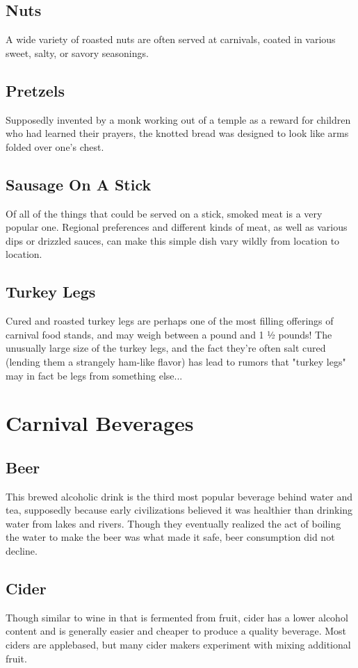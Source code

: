 \documentclass[10pt,a4paper,twoside,bg=print,twocolumn,openany,nodeprecatedcode]{dndbook}
\begin{document}
\subsection{Nuts}
A wide variety of roasted nuts are often served at carnivals, coated in various sweet, salty, or savory seasonings.
\subsection{Pretzels}
Supposedly invented by a monk working out of a temple as a reward for children who had learned their prayers, the knotted bread was designed to look like arms folded over one's chest.
\subsection{Sausage On A Stick}
Of all of the things that could be served on a stick, smoked meat is a very popular one. Regional preferences and different kinds of meat, as well as various dips or drizzled sauces, can make this simple dish vary wildly from location to location.
\subsection{Turkey Legs}
Cured and roasted turkey legs are perhaps one of the most filling offerings of carnival food stands, and may weigh between a pound and 1 ½ pounds! The unusually large size of the turkey legs, and the fact they're often salt cured (lending them a strangely ham-like flavor) has lead to rumors that "turkey legs" may in fact be legs from something else...
\section{Carnival Beverages}
\subsection{Beer}
This brewed alcoholic drink is the third most popular beverage behind water and tea, supposedly because early civilizations believed it was healthier than drinking water from lakes and rivers. Though they eventually realized the act of boiling the water to make the beer was what made it safe, beer consumption did not decline.
\subsection{Cider}
Though similar to wine in that is fermented from fruit, cider has a lower alcohol content and is generally easier and cheaper to produce a quality beverage. Most ciders are applebased, but many cider makers experiment with mixing additional fruit.
\end{document}
